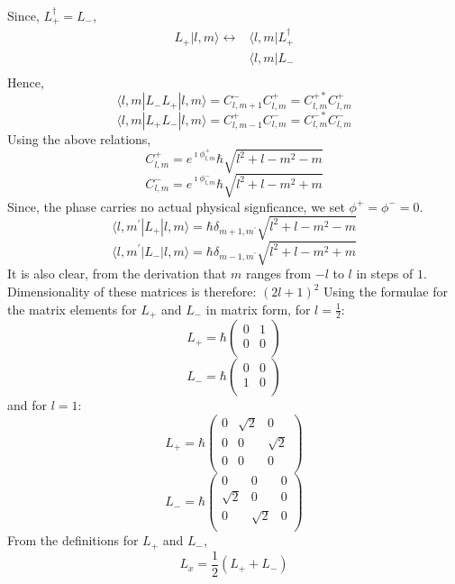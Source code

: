 \documentclass{article}
\begin{document}
Since, $L^{\dagger}_{+} = L_{-}$, 
\begin{align*}
    L_{+} | l,m \rangle \leftrightarrow & \langle l,m | L^{\dagger}_{+} \\
    & \langle l,m | L_{-} \\
\end{align*}
Hence,
$$\langle l,m | L_{-}L_{+} | l,m \rangle = C^{-}_{l,m+1}C^{+}_{l,m} = C^{+ *}_{l,m}C^{+}_{l,m}$$
$$\langle l,m | L_{+}L_{-} | l,m \rangle = C^{+}_{l,m-1}C^{-}_{l,m} = C^{- *}_{l,m}C^{-}_{l,m}$$
Using the above relations, 
$$C^{+}_{l,m} = e^{\imath \phi^{+}_{l,m}} \hbar \sqrt{l^{2}+l-m^{2}-m}$$
$$C^{-}_{l,m} = e^{\imath \phi^{-}_{l,m}} \hbar \sqrt{l^{2}+l-m^{2}+m}$$
Since, the phase carries no actual physical signficance, we set $\phi^{+}=\phi^{-}=0$.
$$\langle l,m^{\prime} | L_{+} | l,m \rangle = \hbar \delta_{m+1,m^{\prime}} \sqrt{l^{2}+l-m^{2}-m}$$  
$$\langle l,m^{\prime} | L_{-} | l,m \rangle = \hbar \delta_{m-1,m^{\prime}} \sqrt{l^{2}+l-m^{2}+m}$$
It is also clear, from the derivation that $m$ ranges from $-l$ to $l$ in steps of $1$.
Dimensionality of these matrices is therefore: $\left(2l+1\right)^{2}$
Using the formulae for the matrix elements for $L_{+}$ and $L_{-}$ in matrix form, for \newline
$l=\frac{1}{2}$: 
$$L_{+}=\hbar \left(
    \begin{array}{cc}
     0 & 1 \\
     0 & 0 \\
    \end{array}
    \right)
$$
$$L_{-}=\hbar \left(
\begin{array}{cc}
 0 & 0 \\
 1 & 0 \\
\end{array}
\right)$$
and for $l=1$:
$$L_{+} = \hbar \left(
    \begin{array}{ccc}
     0 & \sqrt{2} & 0 \\
     0 & 0 & \sqrt{2} \\
     0 & 0 & 0 \\
    \end{array}
    \right)$$
$$L_{-} = \hbar \left(
    \begin{array}{ccc}
     0 & 0 & 0 \\
     \sqrt{2} & 0 & 0 \\
     0 & \sqrt{2} & 0 \\
    \end{array}
    \right)$$
From the definitions for $L_{+}$ and $L_{-}$, 
$$L_{x} = \frac{1}{2} \left(L_{+} + L_{-}\right)$$
\end{document}
